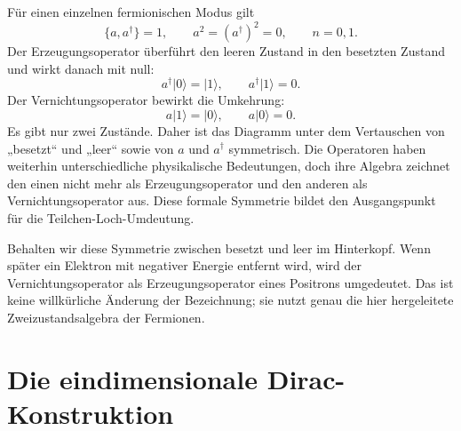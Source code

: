 Für einen einzelnen fermionischen Modus gilt
\begin{equation}
\{a,a^\dagger\}=1,
\qquad
a^2=(a^\dagger)^2=0,
\qquad
n=0,1.
\label{eq:l10-fermion-mode}
\end{equation}
Der Erzeugungsoperator überführt den leeren Zustand in den besetzten Zustand und wirkt danach mit null:
\begin{equation}
a^\dagger\lvert0\rangle=\lvert1\rangle,
\qquad
a^\dagger\lvert1\rangle=0.
\end{equation}
Der Vernichtungsoperator bewirkt die Umkehrung:
\begin{equation}
a\lvert1\rangle=\lvert0\rangle,
\qquad
a\lvert0\rangle=0.
\end{equation}
Es gibt nur zwei Zustände. Daher ist das Diagramm unter dem Vertauschen von „besetzt“ und „leer“ sowie von \(a\) und \(a^\dagger\) symmetrisch. Die Operatoren haben weiterhin unterschiedliche physikalische Bedeutungen, doch ihre Algebra zeichnet den einen nicht mehr als Erzeugungsoperator und den anderen als Vernichtungsoperator aus. Diese formale Symmetrie bildet den Ausgangspunkt für die Teilchen-Loch-Umdeutung.

\begin{classroomqa}
\end{classroomqa}

Behalten wir diese Symmetrie zwischen besetzt und leer im Hinterkopf. Wenn später ein Elektron mit negativer Energie entfernt wird, wird der Vernichtungsoperator als Erzeugungsoperator eines Positrons umgedeutet. Das ist keine willkürliche Änderung der Bezeichnung; sie nutzt genau die hier hergeleitete Zweizustandsalgebra der Fermionen.

\section{Die eindimensionale Dirac-Konstruktion}

